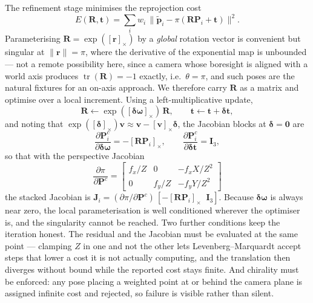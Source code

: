 The refinement stage minimises the reprojection cost
\begin{equation}
E(\mathbf{R}, \mathbf{t}) = \sum_{i} w_i \,
\bigl\| \tilde{\mathbf{p}}_i - \pi(\mathbf{R}\mathbf{P}_i + \mathbf{t}) \bigr\|^2 .
\label{eq:lm_cost}
\end{equation}
Parameterising $\mathbf{R} = \exp([\mathbf{r}]_\times)$ by a \emph{global}
rotation vector is convenient but singular at $\|\mathbf{r}\| = \pi$, where the
derivative of the exponential map is unbounded --- not a remote possibility
here, since a camera whose boresight is aligned with a world axis produces
$\operatorname{tr}(\mathbf{R}) = -1$ exactly, i.e.\ $\theta = \pi$, and such
poses are the natural fixtures for an on-axis approach. We therefore carry
$\mathbf{R}$ as a matrix and optimise over a local increment. Using a
left-multiplicative update,
\begin{equation}
\mathbf{R} \leftarrow \exp([\boldsymbol{\delta\omega}]_\times)\,\mathbf{R},
\qquad
\mathbf{t} \leftarrow \mathbf{t} + \boldsymbol{\delta t} ,
\label{eq:lm_update}
\end{equation}
and noting that $\exp([\boldsymbol{\delta}]_\times)\mathbf{v} \approx
\mathbf{v} - [\mathbf{v}]_\times \boldsymbol{\delta}$, the Jacobian blocks at
$\boldsymbol{\delta} = \mathbf{0}$ are
\begin{equation}
\frac{\partial \mathbf{P}^c_i}{\partial \boldsymbol{\delta\omega}}
  = -[\mathbf{R}\mathbf{P}_i]_\times ,
\qquad
\frac{\partial \mathbf{P}^c_i}{\partial \boldsymbol{\delta t}} = \mathbf{I}_3 ,
\label{eq:lm_jac}
\end{equation}
so that with the perspective Jacobian
\begin{equation}
\frac{\partial \pi}{\partial \mathbf{P}^c}
= \begin{bmatrix}
f_x / Z & 0 & -f_x X / Z^2 \\
0 & f_y / Z & -f_y Y / Z^2
\end{bmatrix}
\label{eq:proj_jac}
\end{equation}
the stacked Jacobian is
$\mathbf{J}_i = (\partial \pi / \partial \mathbf{P}^c)\,
[-[\mathbf{R}\mathbf{P}_i]_\times \;\; \mathbf{I}_3]$.
Because $\boldsymbol{\delta\omega}$ is always near zero, the local
parameterisation is well conditioned wherever the optimiser is, and the
singularity cannot be reached. Two further conditions keep the iteration
honest. The residual and the Jacobian must be evaluated at the same point ---
clamping $Z$ in one and not the other lets Levenberg--Marquardt accept steps
that lower a cost it is not actually computing, and the translation then
diverges without bound while the reported cost stays finite. And chirality
must be enforced: any pose placing a weighted point at or behind the camera
plane is assigned infinite cost and rejected, so failure is visible rather
than silent.

